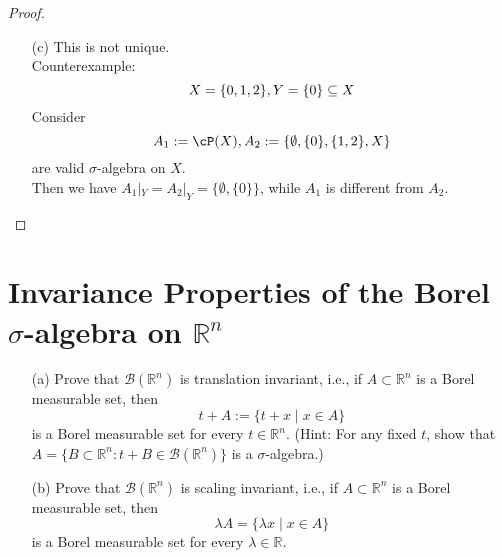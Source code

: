 \documentclass[lang=cn,11pt]{elegantbook}
\begin{document}
\begin{proof}
\begin{itemize}
\begin{enumerate}
    \end{enumerate}

    
    \item[(c)] 
    This is not unique. \\
    \noindent Counterexample:
    \[
    X = \{ 0,1,2\}, Y = \{0\} \subseteq X
    \]
    Consider
    \[
    A_1 := \cP(X), A_2 := \{\emptyset, \{0\}, \{1,2\}, X \}
    \] are valid $\sigma$-algebra on $X$.\\
    \noindent Then we have $A_1 |_Y = A_2 |_Y = \{\emptyset,\{0\}   \}$, while $A_1$ is different from $A_2$.


    
    
\end{itemize}
\end{proof}

\section{Invariance Properties of the Borel $\sigma$-algebra on $\mathbb{R}^n$}
\begin{itemize}
    \item[(a)] Prove that $\mathcal{B}(\mathbb{R}^n)$ is translation invariant, i.e., if $A \subset \mathbb{R}^n$ is a Borel measurable set, then
    \[
    t + A := \{t + x \mid x \in A\}
    \]
    is a Borel measurable set for every $t \in \mathbb{R}^n$. (Hint: For any fixed $t$, show that $A = \{B \subset \mathbb{R}^n : t + B \in \mathcal{B}(\mathbb{R}^n)\}$ is a $\sigma$-algebra.)
    \item[(b)] Prove that $\mathcal{B}(\mathbb{R}^n)$ is scaling invariant, i.e., if $A \subset \mathbb{R}^n$ is a Borel measurable set, then
    \[
    \lambda A = \{\lambda x \mid x \in A\}
    \]
    is a Borel measurable set for every $\lambda \in \mathbb{R}$.
\end{itemize}
\end{document}

